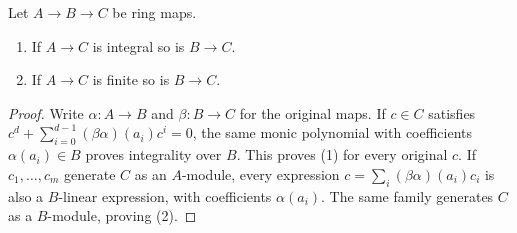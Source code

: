 \begin{lemma}
\label{editorial-source-lemma-integral-permanence}
Let $A \to B \to C$ be ring maps.
\begin{enumerate}
\item If $A \to C$ is integral so is $B \to C$.
\item If $A \to C$ is finite so is $B \to C$.
\end{enumerate}
\end{lemma}

\begin{proof}
Write $\alpha:A\to B$ and $\beta:B\to C$ for the original maps.
If $c\in C$ satisfies
$c^d+\sum_{i=0}^{d-1}(\beta\alpha)(a_i)c^i=0$, the same monic
polynomial with coefficients $\alpha(a_i)\in B$ proves integrality
over $B$. This proves (1) for every original $c$.
If $c_1,\ldots,c_m$ generate $C$ as an $A$-module, every expression
$c=\sum_i(\beta\alpha)(a_i)c_i$ is also a $B$-linear expression,
with coefficients $\alpha(a_i)$. The same family generates $C$
as a $B$-module, proving (2).
\end{proof}